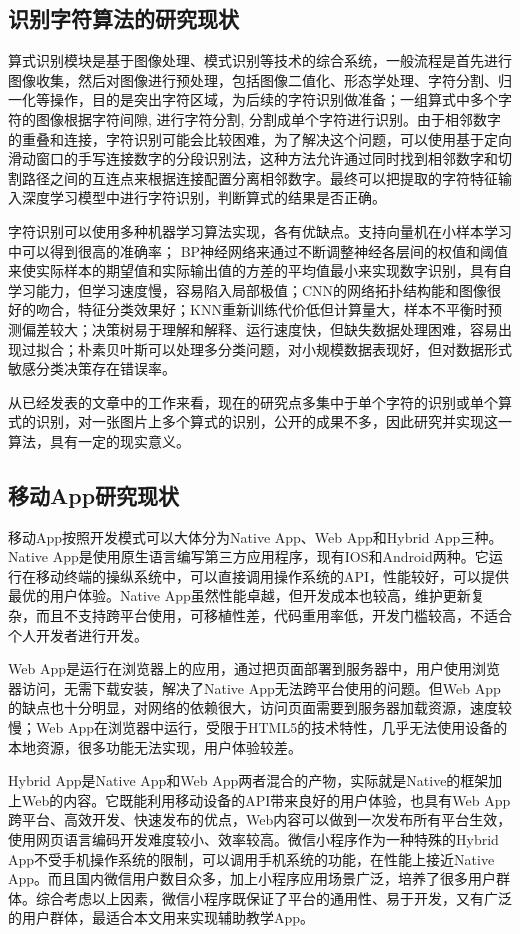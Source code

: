 \subsection{识别字符算法的研究现状}
算式识别模块是基于图像处理、模式识别等技术的综合系统，一般流程是首先进行图像收集，然后对图像进行预处理，包括图像二值化、形态学处理、字符分割、归一化等操作，目的是突出字符区域，为后续的字符识别做准备；一组算式中多个字符的图像根据字符间隙, 进行字符分割, 分割成单个字符进行识别。由于相邻数字的重叠和连接，字符识别可能会比较困难，为了解决这个问题，可以使用基于定向滑动窗口的手写连接数字的分段识别法，这种方法允许通过同时找到相邻数字和切割路径之间的互连点来根据连接配置分离相邻数字。最终可以把提取的字符特征输入深度学习模型中进行字符识别，判断算式的结果是否正确。
\par
字符识别可以使用多种机器学习算法实现，各有优缺点。支持向量机在小样本学习中可以得到很高的准确率； BP神经网络来通过不断调整神经各层间的权值和阈值来使实际样本的期望值和实际输出值的方差的平均值最小来实现数字识别，具有自学习能力，但学习速度慢，容易陷入局部极值；CNN的网络拓扑结构能和图像很好的吻合，特征分类效果好；KNN重新训练代价低但计算量大，样本不平衡时预测偏差较大；决策树易于理解和解释、运行速度快，但缺失数据处理困难，容易出现过拟合；朴素贝叶斯可以处理多分类问题，对小规模数据表现好，但对数据形式敏感分类决策存在错误率。
\par
从已经发表的文章中的工作来看，现在的研究点多集中于单个字符的识别或单个算式的识别，对一张图片上多个算式的识别，公开的成果不多，因此研究并实现这一算法，具有一定的现实意义。

\subsection{移动App研究现状}
移动App按照开发模式可以大体分为Native App、Web App和Hybrid App三种。Native App是使用原生语言编写第三方应用程序，现有IOS和Android两种。它运行在移动终端的操纵系统中，可以直接调用操作系统的API，性能较好，可以提供最优的用户体验。Native App虽然性能卓越，但开发成本也较高，维护更新复杂，而且不支持跨平台使用，可移植性差，代码重用率低，开发门槛较高，不适合个人开发者进行开发。
\par
Web App是运行在浏览器上的应用，通过把页面部署到服务器中，用户使用浏览器访问，无需下载安装，解决了Native App无法跨平台使用的问题。但Web App的缺点也十分明显，对网络的依赖很大，访问页面需要到服务器加载资源，速度较慢；Web App在浏览器中运行，受限于HTML5的技术特性，几乎无法使用设备的本地资源，很多功能无法实现，用户体验较差。
\par
Hybrid App是Native App和Web App两者混合的产物，实际就是Native的框架加上Web的内容。它既能利用移动设备的API带来良好的用户体验，也具有Web App跨平台、高效开发、快速发布的优点，Web内容可以做到一次发布所有平台生效，使用网页语言编码开发难度较小、效率较高。微信小程序作为一种特殊的Hybrid App不受手机操作系统的限制，可以调用手机系统的功能，在性能上接近Native App。而且国内微信用户数目众多，加上小程序应用场景广泛，培养了很多用户群体。综合考虑以上因素，微信小程序既保证了平台的通用性、易于开发，又有广泛的用户群体，最适合本文用来实现辅助教学App。

